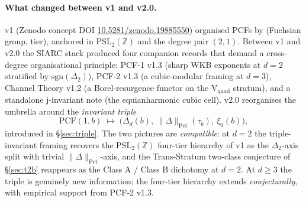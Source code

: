 \documentclass[11pt,a4paper]{article}
\theoremstyle{definition}
\theoremstyle{remark}
\newcommand{\PSLZ}{\mathrm{PSL}_2(\mathbb{Z})}
\newcommand{\PCF}{\mathrm{PCF}}
\newcommand{\PetN}[1]{\lVert #1 \rVert_{\mathrm{Pet}}}
\begin{document}
\paragraph{What changed between v1 and v2.0.}
\label{par:v1-to-v2}
v1 (Zenodo concept DOI \href{https://doi.org/10.5281/zenodo.19885550}{10.5281/zenodo.19885550})
organised PCFs by (Fuchsian group, tier), anchored in $\PSLZ$ and the
degree pair $(2,1)$. Between v1 and v2.0 the SIARC stack produced four
companion records that demand a cross-degree organisational principle:
PCF-1 v1.3 (sharp WKB exponents at $d=2$ stratified by $\mathrm{sgn}(\Delta_2)$),
PCF-2 v1.3 (a cubic-modular framing at $d=3$),
Channel Theory v1.2 (a Borel-resurgence functor on the V$_{\mathrm{quad}}$
stratum), and a standalone j-invariant note (the equianharmonic cubic
cell). v2.0 reorganises the umbrella around the \emph{invariant triple}
\begin{equation}
  \label{eq:invariant-triple}
  \PCF(1,b) \;\longmapsto\; \bigl(\Delta_d(b),\ \PetN{\Delta}(\tau_b),\ \xi_0(b)\bigr),
\end{equation}
introduced in \S\ref{sec:triple}. The two pictures are
\emph{compatible}: at $d=2$ the triple-invariant framing recovers the
$\PSLZ$ four-tier hierarchy of v1 as the $\Delta_2$-axis split with
trivial $\PetN{\Delta}$-axis, and the Trans-Stratum two-class
conjecture of \S\ref{sec:t2b} reappears as the Class A / Class B
dichotomy at $d=2$. At $d \geq 3$ the triple is genuinely new
information; the four-tier hierarchy extends \emph{conjecturally},
with empirical support from PCF-2 v1.3.
\end{document}
